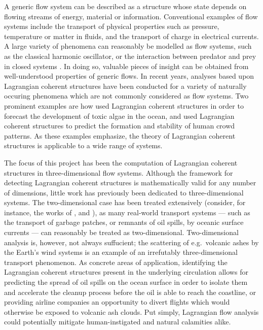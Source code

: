 A generic flow system can be described as a structure whose state depends on
flowing streams of energy, material or information. Conventional examples of
flow systems include the transport of physical properties such as pressure,
temperature or matter in fluids, and the transport of charge in electrical
currents. A large variety of phenomena can reasonably be modelled as flow
systems, such as the classical harmonic oscillator, or the interaction between
predator and prey in closed systems
\parencite[parts I--II]{strogatz2014nonlinear}. In doing so, valuable pieces
of insight can be obtained from well-understood properties of generic flows.
In recent years, analyses based upon Lagrangian coherent structures have been
conducted for a variety of naturally occuring phenomena which are not
commonly considered as flow systems. Two prominent examples are how
\textcite{olascoaga2008tracing} used Lagrangian coherent structures in order
to forecast the development of toxic algae in the ocean, and
\textcite{ali2007lagrangian} used Lagrangian coherent structures to predict
the formation and stability of human crowd patterns. As these examples
emphasize, the theory of Lagrangian coherent structures is applicable to a
wide range of systems.

The focus of this project has been the computation of Lagrangian coherent
structures in three-dimensional flow systems. Although the framework for
detecting Lagrangian coherent structures is mathematically valid for any number
of dimensions, little work has previously been dedicated to three-dimensional
systems. The two-dimensional case has been treated extensively (consider, for
instance, the works of \textcite{haller2000lagrangian},
\textcite{farazmand2012computing} and \textcite{onu2015lcstool}), as many
real-world transport systems --- such as the transport of garbage patches, or
remnants of oil spills, by oceanic surface currents --- can reasonably be
treated as two-dimensional. Two-dimensional analysis is, however, not always
suffucient; the scattering of e.g.\ volcanic ashes by the Earth's wind systems
is an example of an irrefutably three-dimensional transport phenomenon.
As concrete areas of application, identifying the Lagrangian coherent
structures present in the underlying circulation allows for predicting the
spread of oil spills on the ocean surface in order to isolate them and
accelerate the cleanup process before the oil is able to reach the
coastline, or providing airline companies an opportunity to divert flights
which would otherwise be exposed to volcanic ash clouds. Put simply, Lagrangian
flow analysis could potentially mitigate human-instigated and natural
calamities alike.

